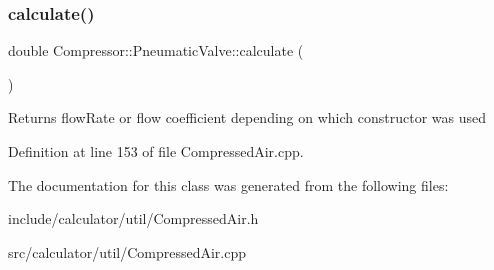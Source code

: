 \subsubsection{\texorpdfstring{calculate()}{calculate()}}
{\footnotesize\ttfamily double Compressor\+::\+Pneumatic\+Valve\+::calculate (\begin{DoxyParamCaption}{ }\end{DoxyParamCaption})}

\begin{DoxyReturn}{Returns}
flow\+Rate or flow coefficient depending on which constructor was used 
\end{DoxyReturn}


Definition at line 153 of file Compressed\+Air.\+cpp.



The documentation for this class was generated from the following files\+:\begin{DoxyCompactItemize}
\item 
include/calculator/util/Compressed\+Air.\+h\item 
src/calculator/util/Compressed\+Air.\+cpp\end{DoxyCompactItemize}
